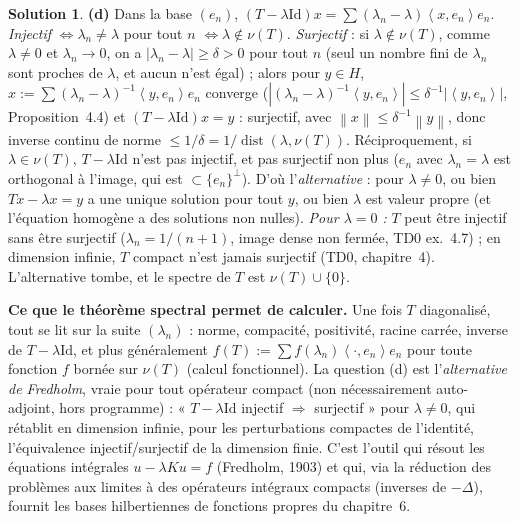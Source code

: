 \documentclass[11pt,a4paper]{article}
\newcommand{\norm}[1]{\left\|#1\right\|}
\DeclareMathOperator{\dist}{dist}
\newcommand{\ps}[2]{\left\langle #1,#2\right\rangle}
\theoremstyle{definition}
\newtheorem*{solution}{Solution}
\begin{document}
\begin{solution}
\medskip
\noindent\textbf{(d)} Dans la base $(e_n)$, $(T-\lambda\mathrm{Id})x=\sum(\lambda_n-\lambda)\ps x{e_n}e_n$. \emph{Injectif} $\iff\lambda_n\ne\lambda$ pour tout $n$ $\iff\lambda\notin\nu(T)$. \emph{Surjectif} : si $\lambda\notin\nu(T)$, comme $\lambda\ne0$ et $\lambda_n\to0$, on a $|\lambda_n-\lambda|\ge\delta>0$ pour tout $n$ (seul un nombre fini de $\lambda_n$ sont proches de $\lambda$, et aucun n'est égal) ; alors pour $y\in H$, $x:=\sum(\lambda_n-\lambda)^{-1}\ps y{e_n}e_n$ converge ($|(\lambda_n-\lambda)^{-1}\ps y{e_n}|\le\delta^{-1}|\ps y{e_n}|$, Proposition~4.4) et $(T-\lambda\mathrm{Id})x=y$ : surjectif, avec $\norm x\le\delta^{-1}\norm y$, donc inverse continu de norme $\le1/\delta=1/\dist(\lambda,\nu(T))$. Réciproquement, si $\lambda\in\nu(T)$, $T-\lambda\mathrm{Id}$ n'est pas injectif, et pas surjectif non plus ($e_n$ avec $\lambda_n=\lambda$ est orthogonal à l'image, qui est $\subset\{e_n\}^\perp$). D'où l'\emph{alternative} : pour $\lambda\ne0$, ou bien $Tx-\lambda x=y$ a une unique solution pour tout $y$, ou bien $\lambda$ est valeur propre (et l'équation homogène a des solutions non nulles). \emph{Pour $\lambda=0$ :} $T$ peut être injectif sans être surjectif ($\lambda_n=1/(n+1)$, image dense non fermée, TD0 ex.~4.7) ; en dimension infinie, $T$ compact n'est jamais surjectif (TD0, chapitre~4). L'alternative tombe, et le spectre de $T$ est $\nu(T)\cup\{0\}$.
\end{solution}

\begin{pointcle}
\textbf{Ce que le théorème spectral permet de calculer.} Une fois $T$ diagonalisé, tout se lit sur la suite $(\lambda_n)$ : norme, compacité, positivité, racine carrée, inverse de $T-\lambda\mathrm{Id}$, et plus généralement $f(T):=\sum f(\lambda_n)\ps\cdot{e_n}e_n$ pour toute fonction $f$ bornée sur $\nu(T)$ (calcul fonctionnel). La question (d) est l'\emph{alternative de Fredholm}, vraie pour tout opérateur compact (non nécessairement auto-adjoint, hors programme) : « $T-\lambda\mathrm{Id}$ injectif $\Rightarrow$ surjectif » pour $\lambda\ne0$, qui rétablit en dimension infinie, pour les perturbations compactes de l'identité, l'équivalence injectif/surjectif de la dimension finie. C'est l'outil qui résout les équations intégrales $u-\lambda Ku=f$ (Fredholm, 1903) et qui, via la réduction des problèmes aux limites à des opérateurs intégraux compacts (inverses de $-\Delta$), fournit les bases hilbertiennes de fonctions propres du chapitre~6.
\end{pointcle}
\end{document}
